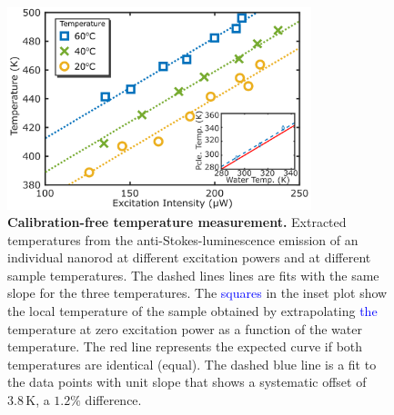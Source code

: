 \documentclass[journal=nalefd,manuscript=letter]{achemso}
\newcommand{\HI}[1]{\textcolor{blue}{#1}} %
\newcommand{\K}{\ensuremath{\,\textrm{K}}}
\begin{document}
\begin{figure}[tp] \centering
\includegraphics[width=88.4mm]{Figures/03_Fit_Of_AS/03_Log_Fit_AS_02.png}
\caption{\textbf{Calibration-free temperature measurement.}
Extracted temperatures from the anti-Stokes-luminescence emission of an individual nanorod
at different excitation powers and at different sample temperatures. 
The dashed lines lines are fits with the same slope for the three temperatures. 
The \HI{squares} in the inset plot show the local temperature of the sample obtained
by extrapolating \HI{the} temperature at zero excitation power as a function of the water temperature.
The red line represents the expected curve if both temperatures are identical (equal). The dashed blue
line is a fit to the data points with unit slope that shows a systematic offset of $3.8\K$, a $1.2\%$ difference.}
	\label{fig:AS_temp}
\end{figure}

\end{document}
